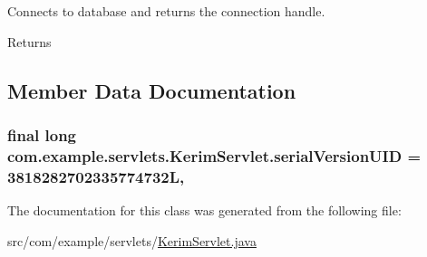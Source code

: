 Connects to database and returns the connection handle. 

\begin{DoxyReturn}{Returns}

\end{DoxyReturn}


\subsection{Member Data Documentation}
\subsubsection[{\texorpdfstring{serial\+Version\+U\+ID}{serialVersionUID}}]{\setlength{\rightskip}{0pt plus 5cm}final long com.\+example.\+servlets.\+Kerim\+Servlet.\+serial\+Version\+U\+ID = 3818282702335774732L\hspace{0.3cm}{\ttfamily [static]}, {\ttfamily [private]}}\hypertarget{classcom_1_1example_1_1servlets_1_1_kerim_servlet_a659a1f9d230ee60ab4f87c1f95d34ab9}{}\label{classcom_1_1example_1_1servlets_1_1_kerim_servlet_a659a1f9d230ee60ab4f87c1f95d34ab9}


The documentation for this class was generated from the following file\+:\begin{DoxyCompactItemize}
\item 
src/com/example/servlets/\hyperlink{_kerim_servlet_8java}{Kerim\+Servlet.\+java}\end{DoxyCompactItemize}

